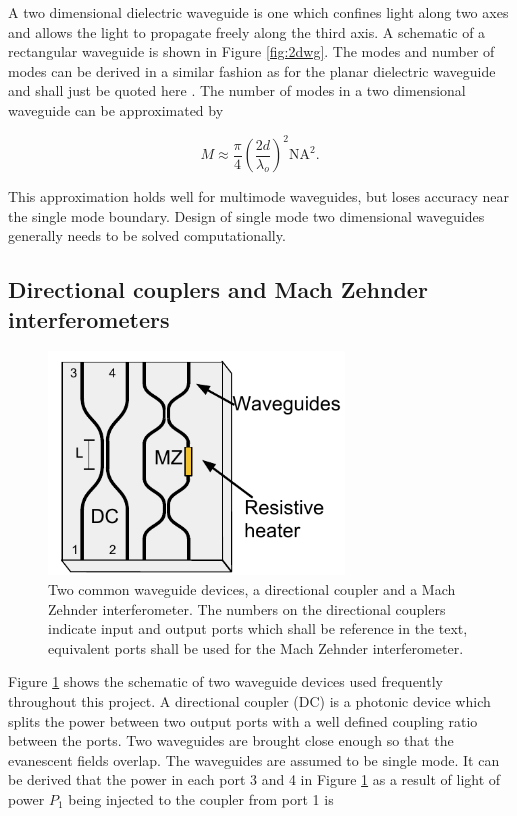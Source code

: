 A two dimensional dielectric waveguide is one which confines light along two
axes and allows the light to propagate freely along the third axis. A schematic
of a rectangular waveguide is shown in Figure \ref{fig:2dwg}. The modes and
number of modes can be derived in a similar fashion as for the planar dielectric
waveguide and shall just be quoted here \cite{saleh1991fundamentals}. The number
of modes in a two dimensional waveguide can be approximated by

\begin{equation} M \approx \frac{\pi}{4} \left( \frac{2d}{\lambda_o } \right)^2
\mathrm{NA}^2. \end{equation}

This approximation holds well for multimode waveguides, but loses accuracy near
the single mode boundary. Design of single mode two dimensional waveguides
generally needs to be solved computationally.

\subsection{Directional couplers and Mach Zehnder interferometers}

\begin{figure}[h!] \begin{center}
\includegraphics[width=0.7\textwidth]{images/wg_devices.pdf} \end{center}
\caption{
Two common waveguide devices, a directional coupler and a Mach Zehnder
interferometer. The numbers on the directional couplers indicate input and
output ports which shall be reference in the text, equivalent ports shall be
used for the Mach Zehnder interferometer.
} \label{fig:wg_devices} \end{figure}

Figure \ref{fig:wg_devices} shows the schematic of two waveguide devices used
frequently throughout this project. A directional coupler (DC) is a photonic
device which splits the power between two output ports with a well defined
coupling ratio between the ports. Two waveguides are brought close enough so
that the evanescent fields overlap. The waveguides are assumed to be single
mode. It can be derived that the power in each port 3 and 4 in Figure
\ref{fig:wg_devices} as a result of light of power $P_1$ being injected to the
coupler from port 1 is

